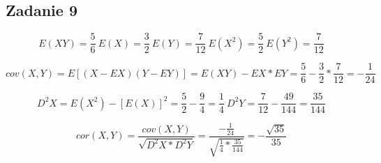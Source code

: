 \subsection{Zadanie 9}
$$
E(XY)=\frac{5}{6} \ E(X)=\frac{3}{2} \ E(Y)=\frac{7}{12} \ E(X^2)=\frac{5}{2} \ E(Y^2)=\frac{7}{12}
$$

$$
cov(X,Y) = E[(X-EX)(Y-EY)] = E(XY)-EX*EY = \frac{5}{6}-\frac{3}{2}*\frac{7}{12}=-\frac{1}{24}
$$

$$
D^2X = E(X^2) - [E(X)]^2 = \frac{5}{2} - \frac{9}{4} = \frac{1}{4} \ 
D^2Y = \frac{7}{12} - \frac{49}{144} = \frac{35}{144}
$$

$$
cor(X,Y) = \frac{cov(X,Y)}{\sqrt{D^2X*D^2Y}} = \frac{-\frac{1}{24}}{\sqrt{\frac{1}{4}*\frac{35}{144}}} = -\frac{\sqrt{35}}{35}
$$
